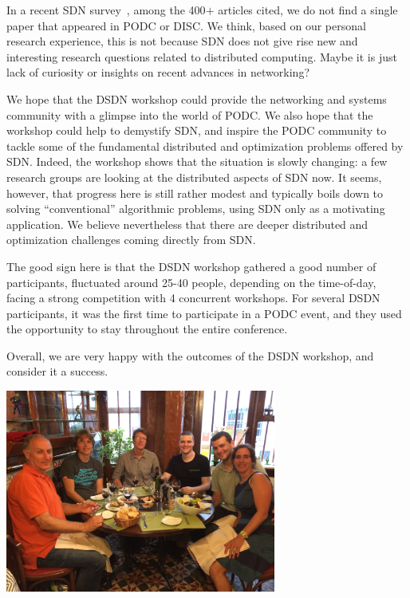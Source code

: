 \documentclass[11pt,pdftex,letter]{article}
\begin{document}
In a recent SDN survey~\cite{sdn-survey}, among the 400$+$ articles cited,
we do not find
a single paper that appeared in PODC or DISC.
We think, based on our personal research experience, this is not
because SDN does not give rise new and interesting
research questions related to distributed computing.
Maybe it is just lack of curiosity or insights on recent
advances in networking?

We hope that the DSDN workshop could
provide the networking and systems community with a glimpse into the
world of PODC. We also hope that the workshop could help to demystify
SDN, and inspire the PODC community
to tackle some of the fundamental distributed and
optimization problems offered by SDN. 
Indeed, the workshop shows that the situation is slowly changing: a few
research groups are looking at the distributed aspects of SDN now.
It seems, however, that progress here is still rather modest and
typically boils down to solving ``conventional'' algorithmic problems,
using SDN only as a motivating application. We believe nevertheless that
there are deeper distributed and optimization challenges coming directly from SDN.

The good sign here is that the DSDN workshop gathered a good number of participants,
fluctuated around 25-40 people, depending on the time-of-day, facing
a strong competition with 4 concurrent workshops.
For several DSDN participants, it was the first time
to participate in a PODC event, and they used the opportunity
to stay throughout the entire conference.

Overall, we are very happy with the outcomes of the DSDN workshop, and consider it
a success.


\begin{center}
\includegraphics[width=3.5in]{dinner.jpg}
\end{center}


\end{document}
